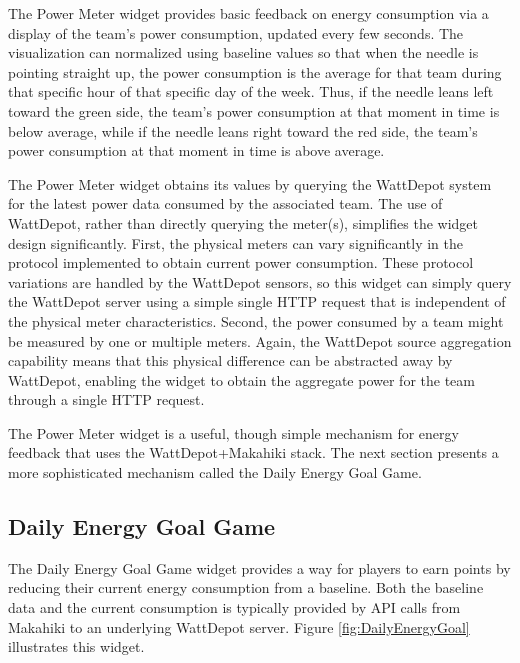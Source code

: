 The Power Meter widget provides basic feedback on energy consumption via a display of the team's power consumption, updated every few seconds.  The visualization can normalized using baseline values so that when the needle is pointing straight up, the power consumption is the average for that team during that specific hour of that specific day of the week.  Thus, if the needle leans left toward the green side, the team's power consumption at that moment in time is below average, while if the needle leans right toward the red side, the team's power consumption at that moment in time is above average.  

The Power Meter widget obtains its values by querying the WattDepot system for the latest power data consumed by the associated team.  The use of WattDepot, rather than directly querying the meter(s), simplifies the widget design significantly.  First, the physical meters can vary significantly in the protocol implemented to obtain current power consumption.   These protocol variations are handled by the WattDepot sensors, so this widget can simply query the WattDepot server using a simple single HTTP request that is independent of the physical meter characteristics.  Second, the power consumed by a team might be measured by one or multiple meters.  Again, the WattDepot source aggregation capability means that this physical difference can be abstracted away by WattDepot, enabling the widget to obtain the aggregate power for the team through a single HTTP request. 

The Power Meter widget is a useful, though simple mechanism for energy feedback that uses the WattDepot+Makahiki stack.   The next section presents a more sophisticated mechanism called the Daily Energy Goal Game.

\subsection{Daily Energy Goal Game}

The Daily Energy Goal Game widget provides a way for players to earn points by reducing their current energy consumption from a baseline. Both the baseline data and the current consumption is typically provided by API calls from Makahiki to an underlying WattDepot server.
Figure \ref{fig:DailyEnergyGoal} illustrates this widget.


